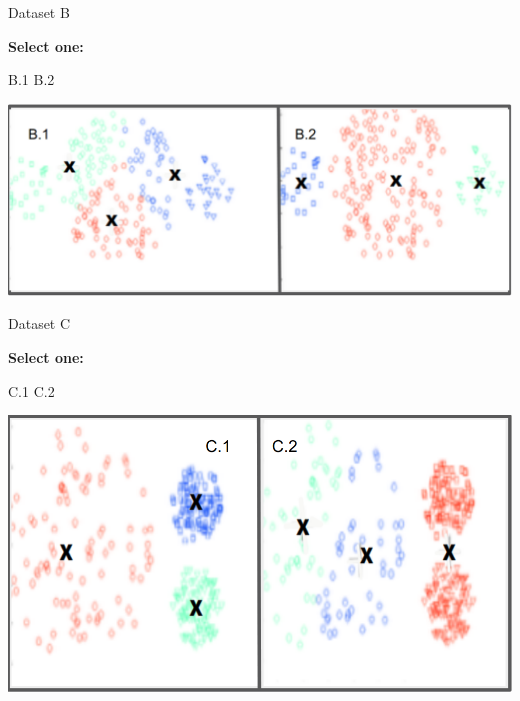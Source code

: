 \documentclass[11pt,addpoints,answers]{exam}
\newcommand{\sone}{\textbf{Select one: }}
\begin{document}
\begin{questions}
\begin{parts}
\begin{subparts}
\subpart[1] Dataset B


\begin{minipage}{.2\textwidth}
    \sone
    
    \begin{checkboxes}
    \choice B.1
    \choice B.2
    \end{checkboxes}
\end{minipage}
\begin{minipage}{.75\textwidth}
\includegraphics[width=.9\linewidth]{figures/d23.png}
\end{minipage}

\subpart[1] Dataset C

\begin{minipage}{.2\textwidth}
    \sone
    
    \begin{checkboxes}
    \choice C.1
    \choice C.2
    \end{checkboxes}
\end{minipage}
\begin{minipage}{.75\textwidth}
\includegraphics[width=.9\linewidth]{figures/d32.png}
\end{minipage}

\end{subparts}


\end{parts}
\end{questions}
\end{document}
